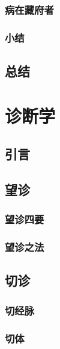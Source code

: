 \documentclass[
]{book}
\begin{document}
\subsection{病在藏府者}\label{ux75c5ux5728ux85cfux5e9cux8005}

\subsection{小结}\label{ux5c0fux7ed3}

\section{总结}\label{ux603bux7ed3}

\chapter{诊断学}\label{ux8bcaux65adux5b66}

\section*{引言}\label{ux5f15ux8a00-1}

\section{望诊}\label{ux671bux8bca}

\subsection{望诊四要}\label{ux671bux8bcaux56dbux8981}

\subsection{望诊之法}\label{ux671bux8bcaux4e4bux6cd5}

\section{切诊}\label{ux5207ux8bca}

\subsection{切经脉}\label{ux5207ux7ecfux8109}

\subsection{切体}\label{ux5207ux4f53}
\end{document}
